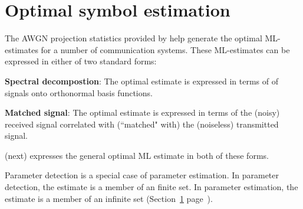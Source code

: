 \section{Optimal symbol estimation}
\label{sec:awgn_est}
The AWGN projection statistics provided by
 help generate the optimal
ML-estimates for a number of communication systems.
These ML-estimates can be expressed in either of two standard forms:
\begin{liste}
  \item {\bf Spectral decompostion}:
     The optimal estimate is expressed in terms of 
     of signals onto orthonormal basis functions.
  \item {\bf Matched signal}:
     The optimal estimate is expressed in terms of the (noisy)
     received signal correlated with (``matched" with)
     the (noiseless) transmitted signal.
\end{liste}
 (next) expresses the general
optimal ML estimate in both of these forms.

Parameter detection is a special case of parameter estimation.
In parameter detection, the estimate is a member of an finite set.
In parameter estimation, the estimate is a member of an infinite set
(Section~\ref{sec:awgn_est} page~\pageref{sec:awgn_est}).


